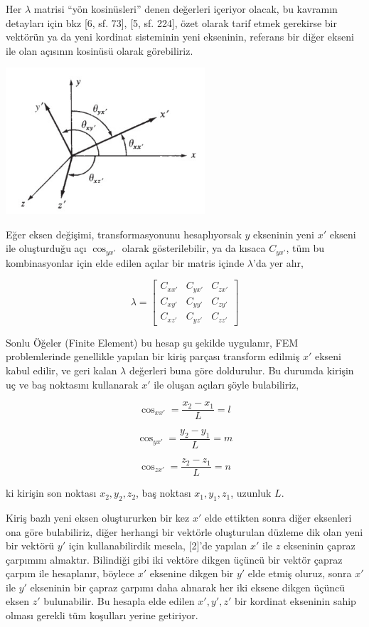 \documentclass[12pt,fleqn]{article}\usepackage{../../common}
\begin{document}
Her $\lambda$ matrisi ``yön kosinüsleri'' denen değerleri içeriyor olacak, bu
kavramın detayları için bkz [6, sf. 73], [5, sf. 224], özet olarak tarif etmek
gerekirse bir vektörün ya da yeni kordinat sisteminin yeni ekseninin, referans
bir diğer ekseni ile olan açısının kosinüsü olarak görebiliriz.

\includegraphics[width=20em]{phy_020_strs_11_04.jpg}

Eğer eksen değişimi, transformasyonunu hesaplıyorsak $y$ ekseninin yeni $x'$
ekseni ile oluşturduğu açı $\cos_{yx'}$ olarak gösterilebilir, ya da kısaca
$C_{yx'}$, tüm bu kombinasyonlar için elde edilen açılar bir matris içinde
$\lambda$'da yer alır,

$$
\lambda = \left[\begin{array}{ccc}
C_{xx'} & C_{yx'} & C_{zx'} \\
C_{xy'} & C_{yy'} & C_{zy'} \\
C_{xz'} & C_{yz'} & C_{zz'} 
\end{array}\right]
$$

Sonlu Öğeler (Finite Element) bu hesap şu şekilde uygulanır, FEM problemlerinde
genellikle yapılan bir kiriş parçası transform edilmiş $x'$ ekseni kabul edilir,
ve geri kalan $\lambda$ değerleri buna göre doldurulur. Bu durumda kirişin uç ve
baş noktasını kullanarak $x'$ ile oluşan açıları şöyle bulabiliriz,

$$
\cos_{xx'} = \frac{x_2 - x_1}{L} = l
$$

$$
\cos_{yx'} = \frac{y_2 - y_1}{L} = m
$$

$$
\cos_{zx'} = \frac{z_2 - z_1}{L} = n
$$

ki kirişin son noktası $x_2,y_2,z_2$, baş noktası $x_1,y_1,z_1$, uzunluk $L$.

Kiriş bazlı yeni eksen oluştururken bir kez $x'$ elde ettikten sonra diğer
eksenleri ona göre bulabiliriz, diğer herhangi bir vektörle oluşturulan düzleme
dik olan yeni bir vektörü $y'$ için kullanabilirdik mesela, [2]'de yapılan $x'$
ile $z$ ekseninin çapraz çarpımını almaktır. Bilindiği gibi iki vektöre dikgen
üçüncü bir vektör çapraz çarpım ile hesaplanır, böylece $x'$ eksenine dikgen bir
$y'$ elde etmiş oluruz, sonra $x'$ ile $y'$ ekseninin bir çapraz çarpımı daha
alınarak her iki eksene dikgen üçüncü eksen $z'$ bulunabilir.  Bu hesapla elde
edilen $x',y',z'$ bir kordinat ekseninin sahip olması gerekli tüm koşulları
yerine getiriyor.
\end{document}
